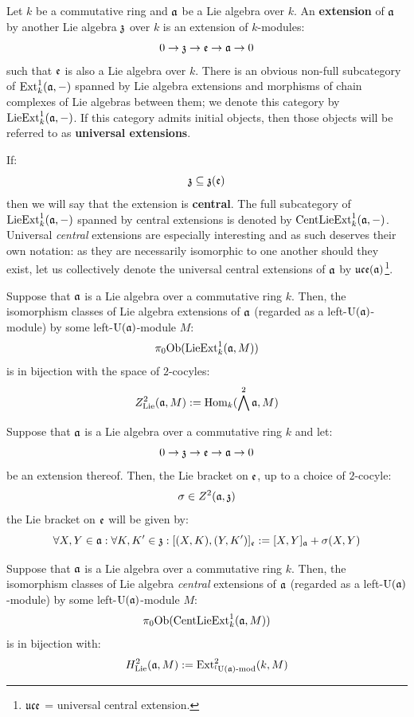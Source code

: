         \begin{definition}
            Let $k$ be a commutative ring and $\mathfrak{a}$ be a Lie algebra over $k$. An \textbf{extension} of $\mathfrak{a}$ by another Lie algebra $\mathfrak{z}$ over $k$ is an extension of $k$-modules:
                $$0 \to \mathfrak{z} \to \mathfrak{e} \to \mathfrak{a} \to 0$$
            such that $\mathfrak{e}$ is also a Lie algebra over $k$. There is an obvious non-full subcategory of $\mathrm{Ext}^1_k(\mathfrak{a}, -)$ spanned by Lie algebra extensions and morphisms of chain complexes of Lie algebras between them; we denote this category by $\mathrm{Lie}\mathrm{Ext}^1_k(\mathfrak{a}, -)$. If this category admits initial objects, then those objects will be referred to as \textbf{universal extensions}.
            
            If:
                $$\mathfrak{z} \subseteq \mathfrak{z}(\mathfrak{e})$$
            then we will say that the extension is \textbf{central}. The full subcategory of $\mathrm{Lie}\mathrm{Ext}^1_k(\mathfrak{a}, -)$ spanned by central extensions is denoted by $\mathrm{Cent}\mathrm{Lie}\mathrm{Ext}^1_k(\mathfrak{a}, -)$. Universal \textit{central} extensions are especially interesting and as such deserves their own notation: as they are necessarily isomorphic to one another should they exist, let us collectively denote the universal central extensions of $\mathfrak{a}$ by $\mathfrak{uce}(\mathfrak{a})$\footnote{$\mathfrak{uce}$ = universal central extension.}.
        \end{definition}
        \begin{lemma}[$Z^2_{\Lie}$ = all extensions]
            Suppose that $\mathfrak{a}$ is a Lie algebra over a commutative ring $k$. Then, the isomorphism classes of Lie algebra extensions of $\mathfrak{a}$ (regarded as a left-$\mathrm{U}(\mathfrak{a})$-module) by some left-$\mathrm{U}(\mathfrak{a})$-module $M$:
                $$\pi_0\mathrm{Ob}( \mathrm{Lie}\mathrm{Ext}^1_k(\mathfrak{a}, M) )$$
            is in bijection with the space of $2$-cocyles:
                $$Z^2_{\mathrm{Lie}}(\mathfrak{a}, M) := \mathrm{Hom}_k( \bigwedge^2 \mathfrak{a}, M )$$
        \end{lemma}
        \begin{corollary}[Extensions = semi-direct products]
            Suppose that $\mathfrak{a}$ is a Lie algebra over a commutative ring $k$ and let:
                $$0 \to \mathfrak{z} \to \mathfrak{e} \to \mathfrak{a} \to 0$$
            be an extension thereof. Then, the Lie bracket on $\mathfrak{e}$, up to a choice of $2$-cocyle:
                $$\sigma \in Z^2(\mathfrak{a}, \mathfrak{z})$$
            the Lie bracket on $\mathfrak{e}$ will be given by:
                $$\forall X, Y \in \mathfrak{a}: \forall K, K' \in \mathfrak{z}: [ (X, K), (Y, K') ]_{\mathfrak{e}} := [X, Y]_{\mathfrak{a}} + \sigma(X, Y)$$
        \end{corollary}
        \begin{proposition}[$H^2_{\Lie}$ = central extensions]
            \cite[Theorem VIII.3.3]{hilton_stammbach_homological_algebra} Suppose that $\mathfrak{a}$ is a Lie algebra over a commutative ring $k$. Then, the isomorphism classes of Lie algebra \textit{central} extensions of $\mathfrak{a}$ (regarded as a left-$\mathrm{U}(\mathfrak{a})$-module) by some left-$\mathrm{U}(\mathfrak{a})$-module $M$:
                $$\pi_0\mathrm{Ob}( \mathrm{Cent}\mathrm{Lie}\mathrm{Ext}^1_k(\mathfrak{a}, M) )$$
            is in bijection with:
                $$H^2_{\mathrm{Lie}}(\mathfrak{a}, M) := \mathrm{Ext}^2_{{}^l\mathrm{U}(\mathfrak{a})\text{-}\mathrm{mod}}(k, M)$$
        \end{proposition}
